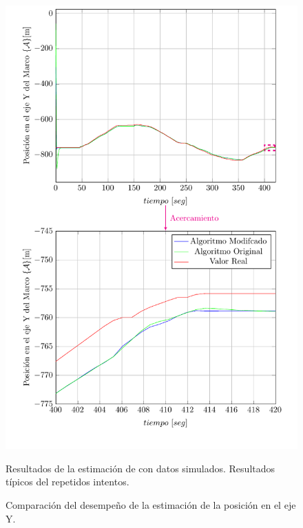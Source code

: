\documentclass[10pt]{report}
\numberwithin{equation}{chapter}
\numberwithin{algorithm}{chapter}
\begin{document}
\begin{figure}
\begin{center}
\includegraphics[scale=0.8]
{PlotY4b.pdf}
\caption{Comparación del desempeño de la estimación de la posición en el eje Y.}
\scriptsize{Resultados de la estimación de con datos simulados. Resultados típicos del repetidos intentos.}
\label{PlotY1}
\end{center}
\end{figure}
\end{document}
